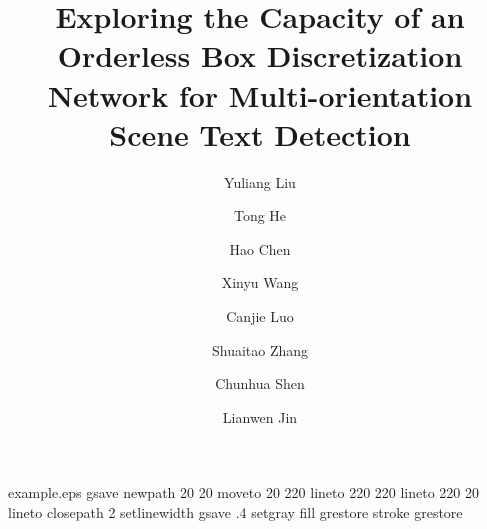 




\begin{filecontents*}{example.eps}
gsave
newpath
  20 20 moveto
  20 220 lineto
  220 220 lineto
  220 20 lineto
closepath
2 setlinewidth
gsave
  .4 setgray fill
grestore
stroke
grestore
\end{filecontents*}
\RequirePackage{fix-cm}
\documentclass[twocolumn]{svjour3}          \smartqed  

\usepackage{mathptmx}


\usepackage{epsfig}
\usepackage{graphicx}
\usepackage{amsmath}
\usepackage{amssymb}
\usepackage{epstopdf}
\usepackage{makecell,multirow,diagbox}
\usepackage[pagebackref=true,breaklinks=true,letterpaper=true,colorlinks,bookmarks=false,citecolor=blue]{hyperref}
\usepackage{color}
\usepackage{subfigure}
\usepackage{url}

\usepackage{xspace}

\usepackage[numbers,sort]{natbib}
\usepackage{caption}
\captionsetup{margin=0.1pt,font=footnotesize,labelfont=bf}
\setlength{\abovecaptionskip}{4pt}
\setlength{\belowcaptionskip}{2pt}
\hsize=2in 







\def\Orderless{Orderless\xspace}
\def\Ours{{OBD}\xspace}


\def\multioriented{multi-orientation\xspace}
\def\multiorientedB{Multi-orientation\xspace}







\title{Exploring the Capacity of an \Orderless Box Discretization Network for Multi-orientation Scene Text Detection}










\author{
Yuliang Liu 
\and
Tong He
\and
Hao Chen
\and
Xinyu Wang
\and
Canjie Luo
\and
Shuaitao Zhang
\and
Chunhua Shen
\and
Lianwen Jin
}








